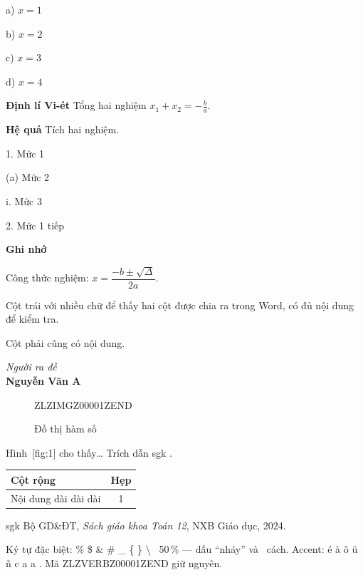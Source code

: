 \documentclass[11pt]{article}
\theoremstyle{definition}
\begin{document}
a) $x=1$

b) $x=2$

c) $x=3$

d) $x=4$




\textbf{Định lí Vi-ét} Tổng hai nghiệm $x_1+x_2=-\frac{b}{a}$.

\textbf{Hệ quả} Tích hai nghiệm.




1. Mức 1
  

(a) Mức 2
    

i. Mức 3

2. Mức 1 tiếp





\textbf{Ghi nhớ}


Công thức nghiệm: $x=\dfrac{-b\pm\sqrt{\Delta}}{2a}$.







Cột trái với nhiều chữ để thấy hai cột được chia ra trong Word, có đủ nội dung để kiểm tra.
 
Cột phải cũng có nội dung.







\textit{Người ra đề}\\
\textbf{Nguyễn Văn A}




\begin{figure}[ht]
\centering


ZLZIMGZ00001ZEND


\caption{Đồ thị hàm số}
\end{figure}
Hình~[fig:1] cho thấy\ldots{} Trích dẫn  sgk .

\begin{tabularx}{\textwidth}{|X|c|}
\hline
  Cột rộng & Hẹp \\ \hline
Nội dung dài dài dài &   1 \\ \hline
\end{tabularx}




 sgk  Bộ GD\&ĐT, \emph{Sách giáo khoa Toán 12}, NXB Giáo dục, 2024.




Ký tự đặc biệt: \% \$ \& \# \_ \{ \} \textbackslash{}  \    50\,\% --- dấu ``nháy'' và ~cách. Accent: \'e \`a \^o \"u \~n  c   a   a .
Mã ZLZVERBZ00001ZEND giữ nguyên.
\end{document}
